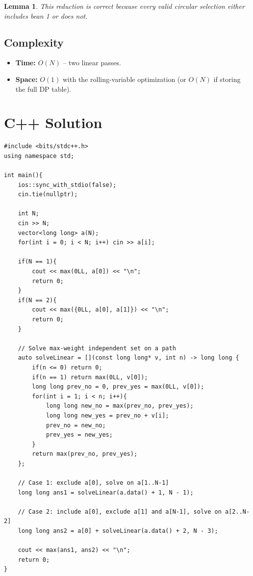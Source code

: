 \documentclass[11pt,a4paper]{article}
\newtheorem{lemma}[theorem]{Lemma}
\begin{document}
\begin{lemma}
This reduction is correct because every valid circular selection either includes bean 1 or does not.
\end{lemma}

\subsection{Complexity}
\begin{itemize}
    \item \textbf{Time:} $O(N)$ -- two linear passes.
    \item \textbf{Space:} $O(1)$ with the rolling-variable optimization (or $O(N)$ if storing the full DP table).
\end{itemize}

\section{C++ Solution}

\begin{lstlisting}
#include <bits/stdc++.h>
using namespace std;

int main(){
    ios::sync_with_stdio(false);
    cin.tie(nullptr);

    int N;
    cin >> N;
    vector<long long> a(N);
    for(int i = 0; i < N; i++) cin >> a[i];

    if(N == 1){
        cout << max(0LL, a[0]) << "\n";
        return 0;
    }
    if(N == 2){
        cout << max({0LL, a[0], a[1]}) << "\n";
        return 0;
    }

    // Solve max-weight independent set on a path
    auto solveLinear = [](const long long* v, int n) -> long long {
        if(n <= 0) return 0;
        if(n == 1) return max(0LL, v[0]);
        long long prev_no = 0, prev_yes = max(0LL, v[0]);
        for(int i = 1; i < n; i++){
            long long new_no = max(prev_no, prev_yes);
            long long new_yes = prev_no + v[i];
            prev_no = new_no;
            prev_yes = new_yes;
        }
        return max(prev_no, prev_yes);
    };

    // Case 1: exclude a[0], solve on a[1..N-1]
    long long ans1 = solveLinear(a.data() + 1, N - 1);

    // Case 2: include a[0], exclude a[1] and a[N-1], solve on a[2..N-2]
    long long ans2 = a[0] + solveLinear(a.data() + 2, N - 3);

    cout << max(ans1, ans2) << "\n";
    return 0;
}
\end{lstlisting}
\end{document}
